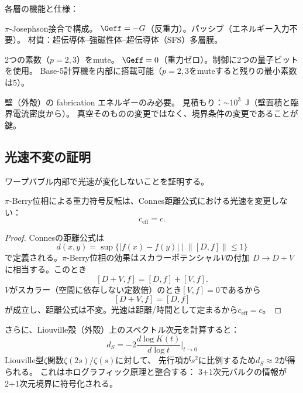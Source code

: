 \noindent
各層の機能と仕様：

\begin{description}[leftmargin=2em]
\item[外殻（$\pi$-接合層）] $\pi$-Josephson接合で構成。
$\Geff = -G$（反重力）。パッシブ（エネルギー入力不要）。
材質：超伝導体--強磁性体--超伝導体（SFS）多層膜。

\item[内部（muted真空）] 2つの素数（$p=2, 3$）をmute。
$\Geff = 0$（重力ゼロ）。制御に2つの量子ビットを使用。
Base-5計算機を内部に搭載可能（$p=2,3$をmuteすると残りの最小素数は$5$）。

\item[エネルギー] 壁（外殻）の fabrication エネルギーのみ必要。
見積もり：$\sim 10^3$~J（壁面積と臨界電流密度から）。
真空そのものの変更ではなく、境界条件の変更であることが鍵。
\end{description}


\subsection{光速不変の証明}
\label{sec:13.5}

ワープバブル内部で光速が変化しないことを証明する。

\begin{theorem}[バブル内光速不変]
$\pi$-Berry位相による重力符号反転は、Connes距離公式における光速を変更しない：
\[
c_{\mathrm{eff}} = c.
\]
\end{theorem}

\begin{proof}
Connesの距離公式は
\[
d(x,y) = \sup\bigl\{ |f(x) - f(y)| \;\big|\; \| [D, f] \| \leq 1 \bigr\}
\]
で定義される。$\pi$-Berry位相の効果はスカラーポテンシャル$V$の付加
$D \to D + V$に相当する。このとき
\[
[D + V, f] = [D, f] + [V, f].
\]
$V$がスカラー（空間に依存しない定数倍）のとき$[V, f] = 0$であるから
\[
[D + V, f] = [D, f]
\]
が成立し、距離公式は不変。光速は距離/時間として定まるから$c_{\mathrm{eff}} = c$。
\end{proof}

\noindent
さらに、Liouville殻（外殻）上のスペクトル次元を計算すると：
\[
d_S = -2\frac{d\log K(t)}{d\log t}\bigg|_{t\to 0}
\]
Liouville型$\zeta$関数$\zeta(2s)/\zeta(s)$に対して、
先行項が$s^2$に比例するため$d_S \approx 2$が得られる。
これはホログラフィック原理と整合する：
3+1次元バルクの情報が2+1次元境界に符号化される。




